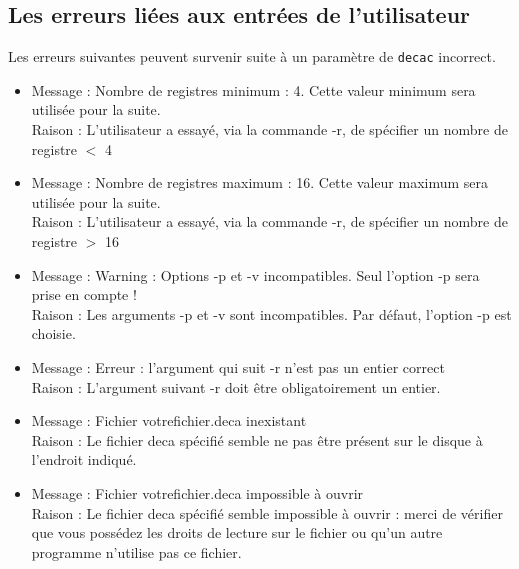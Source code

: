 \documentclass[11pt]{article}
\begin{document}
   \subsection{Les erreurs liées aux entrées de l'utilisateur}
   Les erreurs suivantes peuvent survenir suite à un paramètre de \verb!decac! incorrect.
   \begin{itemize}
   \item Message : Nombre de registres minimum : 4. Cette valeur minimum sera utilisée pour la suite. \\
         Raison : L'utilisateur a essayé, via la commande -r, de spécifier un nombre de registre $<$ 4
   \item Message : Nombre de registres maximum : 16. Cette valeur maximum sera utilisée pour la suite. \\
         Raison : L'utilisateur a essayé, via la commande -r, de spécifier un nombre de registre $>$ 16
   \item Message : Warning : Options -p et -v incompatibles. Seul l'option -p sera prise en compte ! \\
         Raison : Les arguments -p et -v sont incompatibles. Par défaut, l'option -p est choisie.
   \item Message : Erreur : l'argument qui suit -r n'est pas un entier correct \\
         Raison : L'argument suivant -r doit être obligatoirement un entier.
   \item Message : Fichier votrefichier.deca inexistant \\
         Raison : Le fichier deca spécifié semble ne pas être présent sur le disque à l'endroit indiqué.
   \item Message : Fichier votrefichier.deca impossible à ouvrir\\
         Raison : Le fichier deca spécifié semble impossible à ouvrir : merci de vérifier que vous possédez les droits de lecture sur le fichier ou qu'un autre programme n'utilise pas ce fichier.
   \end{itemize}
\end{document}
